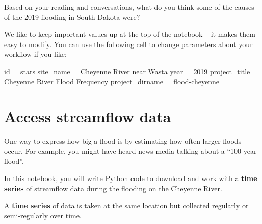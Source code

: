 \documentclass[
  letterpaper,
  DIV=11,
  numbers=noendperiod,
  oneside]{scrreprt}
\newenvironment{Shaded}{\begin{snugshade}}{\end{snugshade}}
\newcommand{\BuiltInTok}[1]{\textcolor[rgb]{0.00,0.23,0.31}{#1}}
\newcommand{\DecValTok}[1]{\textcolor[rgb]{0.68,0.00,0.00}{#1}}
\newcommand{\NormalTok}[1]{\textcolor[rgb]{0.00,0.23,0.31}{#1}}
\newcommand{\OperatorTok}[1]{\textcolor[rgb]{0.37,0.37,0.37}{#1}}
\newcommand{\StringTok}[1]{\textcolor[rgb]{0.13,0.47,0.30}{#1}}
\begin{document}
\begin{tcolorbox}[enhanced jigsaw, colbacktitle=quarto-callout-color!10!white, opacityback=0, bottomtitle=1mm, toptitle=1mm, bottomrule=.15mm, left=2mm, colframe=quarto-callout-color-frame, leftrule=.75mm, opacitybacktitle=0.6, colback=white, rightrule=.15mm, toprule=.15mm, breakable, titlerule=0mm, title=\textcolor{quarto-callout-color}{\faInfo}\hspace{0.5em}{Reflect and Respond}, coltitle=black, arc=.35mm]

Based on your reading and conversations, what do you think some of the
causes of the 2019 flooding in South Dakota were?

\end{tcolorbox}

We like to keep important values up at the top of the notebook -- it
makes them easy to modify. You can use the following cell to change
parameters about your workflow if you like:

\begin{Shaded}
\begin{Highlighting}[]
\BuiltInTok{id} \OperatorTok{=} \StringTok{\textquotesingle{}stars\textquotesingle{}}
\NormalTok{site\_name }\OperatorTok{=} \StringTok{\textquotesingle{}Cheyenne River near Wasta\textquotesingle{}}
\NormalTok{year }\OperatorTok{=} \DecValTok{2019}
\NormalTok{project\_title }\OperatorTok{=} \StringTok{\textquotesingle{}Cheyenne River Flood Frequency\textquotesingle{}}
\NormalTok{project\_dirname }\OperatorTok{=} \StringTok{\textquotesingle{}flood{-}cheyenne\textquotesingle{}}
\end{Highlighting}
\end{Shaded}


\chapter{Access streamflow data}\label{access-streamflow-data}

One way to express how big a flood is by estimating how often larger
floods occur. For example, you might have heard news media talking about
a ``100-year flood''.

In this notebook, you will write Python code to download and work with a
\textbf{time series} of streamflow data during the flooding on the
Cheyenne River.

\begin{tcolorbox}[enhanced jigsaw, colbacktitle=quarto-callout-tip-color!10!white, opacityback=0, bottomtitle=1mm, toptitle=1mm, bottomrule=.15mm, left=2mm, colframe=quarto-callout-tip-color-frame, leftrule=.75mm, opacitybacktitle=0.6, colback=white, rightrule=.15mm, toprule=.15mm, breakable, titlerule=0mm, title=\textcolor{quarto-callout-tip-color}{\faLightbulb}\hspace{0.5em}{Tip}, coltitle=black, arc=.35mm]

A \textbf{time series} of data is taken at the same location but
collected regularly or semi-regularly over time.

\end{tcolorbox}
\end{document}
